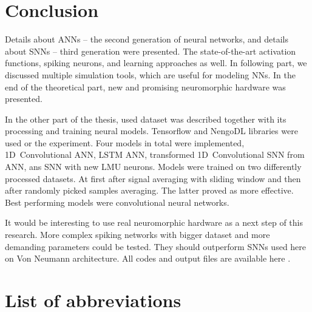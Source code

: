 \chapter*{Conclusion}
\label{ch:conclusion}

Details about ANNs -- the second generation of neural networks, and details about SNNs -- third generation were presented. The state-of-the-art activation functions, spiking neurons, and learning approaches as well. In following part, we discussed multiple simulation tools, which are useful for modeling NNs. In the end of the theoretical part, new and promising neuromorphic hardware was presented.

In the other part of the thesis, used dataset was described together with its processing and training neural models. Tensorflow and NengoDL libraries were used or the experiment. Four models in total were implemented, 1D~Convolutional ANN, LSTM ANN, transformed 1D~Convolutional SNN from ANN, ans SNN with new LMU neurons. Models were trained on two differently processed datasets. At first after signal averaging with sliding window and then after randomly picked samples averaging. The latter proved as more effective. Best performing models were convolutional neural networks.

It would be interesting to use real neuromorphic hardware as a next step of this research. More complex spiking networks with bigger dataset and more demanding parameters could be tested. They should outperform SNNs used here on Von Neumann architecture. All codes and output files are available here \cite{thesis-code}.


\chapter*{List of abbreviations}

